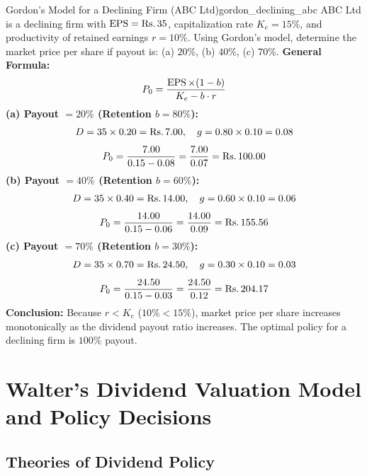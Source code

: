 \begin{example}{Gordon's Model for a Declining Firm (ABC Ltd)}{gordon_declining_abc}
ABC Ltd is a declining firm with $\operatorname{EPS} = \text{Rs.}\, 35$, capitalization rate $K_e = 15\%$, and productivity of retained earnings $r = 10\%$. Using Gordon's model, determine the market price per share if payout is: (a) $20\%$, (b) $40\%$, (c) $70\%$.
\tcblower
\textbf{General Formula:}
\begin{equation*}
    P_0 = \frac{\operatorname{EPS} \times (1 - b)}{K_e - b \cdot r}
\end{equation*}
\textbf{(a) Payout $= 20\%$ (Retention $b = 80\%$):}
\begin{equation*}
    D = 35 \times 0.20 = \text{Rs.}\, 7.00, \quad g = 0.80 \times 0.10 = 0.08
\end{equation*}
\begin{equation*}
    P_0 = \frac{7.00}{0.15 - 0.08} = \frac{7.00}{0.07} = \text{Rs.}\, 100.00
\end{equation*}
\textbf{(b) Payout $= 40\%$ (Retention $b = 60\%$):}
\begin{equation*}
    D = 35 \times 0.40 = \text{Rs.}\, 14.00, \quad g = 0.60 \times 0.10 = 0.06
\end{equation*}
\begin{equation*}
    P_0 = \frac{14.00}{0.15 - 0.06} = \frac{14.00}{0.09} = \text{Rs.}\, 155.56
\end{equation*}
\textbf{(c) Payout $= 70\%$ (Retention $b = 30\%$):}
\begin{equation*}
    D = 35 \times 0.70 = \text{Rs.}\, 24.50, \quad g = 0.30 \times 0.10 = 0.03
\end{equation*}
\begin{equation*}
    P_0 = \frac{24.50}{0.15 - 0.03} = \frac{24.50}{0.12} = \text{Rs.}\, 204.17
\end{equation*}
\textbf{Conclusion:} Because $r < K_e$ ($10\% < 15\%$), market price per share increases monotonically as the dividend payout ratio increases. The optimal policy for a declining firm is $100\%$ payout.
\end{example}

\section{Walter's Dividend Valuation Model and Policy Decisions}

\subsection{Theories of Dividend Policy}

